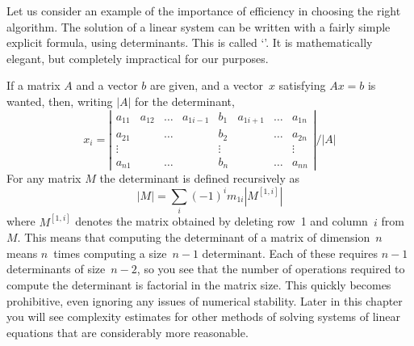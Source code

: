 Let us consider an example of the importance of efficiency in choosing
the right algorithm.
The solution of a linear system can be written with a fairly simple
explicit formula, using determinants. This is called
`'. It is mathematically elegant, but
completely impractical for our purposes.

If a matrix $A$ and a vector $b$ are given, and a vector~$x$
satisfying $Ax=b$ is wanted, then,
writing $|A|$ for the determinant,
  \[ x_i=\left|
    \begin{matrix}
      a_{11}&a_{12}&\ldots&a_{1i-1}&b_1&a_{1i+1}&\ldots&a_{1n}\\
      a_{21}&      &\ldots&        &b_2&        &\ldots&a_{2n}\\
      \vdots&      &      &        &\vdots&     &      &\vdots\\
      a_{n1}&      &\ldots&        &b_n&        &\ldots&a_{nn}
    \end{matrix}\right|
    / |A|
    \]
For any matrix $M$ the determinant is defined recursively as
\[ |M| = \sum_i (-1)^im_{1i}|M^{[1,i]}| \]
where $M^{[1,i]}$ denotes the matrix obtained by deleting row~1 and
column~$i$ from~$M$. This means that computing the determinant of a
matrix of dimension~$n$ means $n$~times computing a size~$n-1$
determinant. Each of these requires $n-1$ determinants of size~$n-2$, so
you see that the number of operations
required to compute the determinant is factorial in the matrix
size. This quickly becomes prohibitive, even ignoring any issues of
numerical stability.
Later in this chapter you will see complexity estimates for other
methods of solving systems of linear equations that are considerably
more reasonable.

